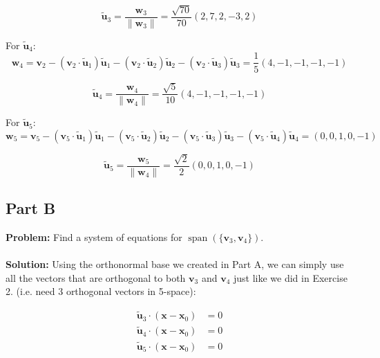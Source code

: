 \documentclass{article}
\begin{document}
$$\tilde{\mathbf u}_3=\frac{\mathbf w_3}{\|\mathbf w_3\|}=\frac{\sqrt{70}}{70}(2,7,2,-3,2)$$

For $\tilde{\mathbf u}_4$:
$$\mathbf w_4=\mathbf v_2-(\mathbf v_2\cdot\tilde{\mathbf u}_1)\tilde{\mathbf u}_1-(\mathbf v_2\cdot\tilde{\mathbf u}_2)\tilde{\mathbf u}_2-(\mathbf v_2\cdot\tilde{\mathbf u}_3)\tilde{\mathbf u}_3=\frac{1}{5}(4,-1,-1,-1,-1)$$

$$\tilde{\mathbf u}_4=\frac{\mathbf w_4}{\|\mathbf w_4\|}=\frac{\sqrt{5}}{10}(4,-1,-1,-1,-1)$$

For $\tilde{\mathbf u}_5$:
$$\mathbf w_5=\mathbf v_5-(\mathbf v_5\cdot\tilde{\mathbf u}_1)\tilde{\mathbf u}_1-(\mathbf v_5\cdot\tilde{\mathbf u}_2)\tilde{\mathbf u}_2-(\mathbf v_5\cdot\tilde{\mathbf u}_3)\tilde{\mathbf u}_3-(\mathbf v_5\cdot\tilde{\mathbf u}_4)\tilde{\mathbf u}_4=(0,0,1,0,-1)$$

$$\tilde{\mathbf u}_5=\frac{\mathbf w_5}{\|\mathbf w_4\|}=\frac{\sqrt{2}}{2}(0,0,1,0,-1)$$

\subsection*{Part B}
\textbf{Problem:} Find a system of equations for $\operatorname{span}(\{\mathbf v_3,\mathbf v_4\})$.
\\\\
\textbf{Solution:} Using the orthonormal base we created in Part A, we can simply use all the vectors that are orthogonal to both $\mathbf v_3$ and $\mathbf v_4$ just like we did in Exercise 2. (i.e. need 3 orthogonal vectors in 5-space):

\begin{align*}
  \tilde{\mathbf u}_3\cdot(\mathbf x-\mathbf x_0) &= 0\\
  \tilde{\mathbf u}_4\cdot(\mathbf x-\mathbf x_0) &= 0\\
  \tilde{\mathbf u}_5\cdot(\mathbf x-\mathbf x_0) &= 0
\end{align*}
\end{document}
